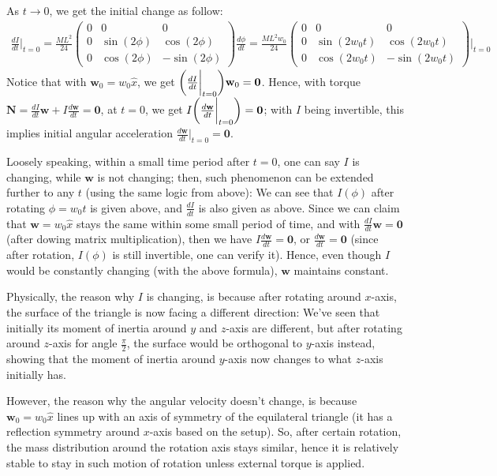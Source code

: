 \documentclass{article}
\DeclarePairedDelimiter{\paran}{(}{)}%
\newcommand{\bN}{\textbf{N}} %
\newcommand{\bw}{\textbf{w}} %
\newcommand{\bzero}{\textbf{0}}
\begin{document}
As $t\rightarrow 0$, we get the initial change as follow:
\begin{align}
    \frac{dI}{dt}\bigg|_{t=0} = \frac{ML^2}{24}\begin{pmatrix}
        0&0&0\\
        0&\sin(2\phi)&\cos(2\phi)\\
        0 & \cos(2\phi) & -\sin(2\phi)
    \end{pmatrix}\frac{d\phi}{dt} = \frac{ML^2w_0}{24}\begin{pmatrix}
        0&0&0\\
        0&\sin(2w_0t)&\cos(2w_0t)\\
        0 & \cos(2w_0t) & -\sin(2w_0t)
    \end{pmatrix}\bigg|_{t=0}
\end{align}
Notice that with $\bw_0 = w_0\hat{x}$, we get $\paran*{\frac{dI}{dt}\bigg|_{t=0}}\bw_0 = \bzero$. Hence, with torque $\bN = \frac{dI}{dt}\bw + I\frac{d\bw}{dt}=\bzero$, at $t=0$, we get $I\paran*{\frac{d\bw}{dt}\bigg|_{t=0}} = \bzero$; with $I$ being invertible, this implies initial angular acceleration $\frac{d\bw}{dt}\bigg|_{t=0}=\bzero$.

Loosely speaking, within a small time period after $t=0$, one can say $I$ is changing, while $\bw$ is not changing; then, such phenomenon can be extended further to any $t$ (using the same logic from above): We can see that $I(\phi)$ after rotating $\phi = w_0t$ is given above, and $\frac{dI}{dt}$ is also given as above. Since we can claim that $\bw=w_0\hat{x}$ stays the same within some small period of time, and with $\frac{dI}{dt}\bw = \bzero$ (after dowing matrix multiplication), then we have $I\frac{d\bw}{dt}=\bzero$, or $\frac{d\bw}{dt}=\bzero$ (since after rotation, $I(\phi)$ is still invertible, one can verify it). Hence, even though $I$ would be constantly changing (with the above formula), $\bw$ maintains constant.

Physically, the reason why $I$ is changing, is because after rotating around $x$-axis, the surface of the triangle is now facing a different direction: We've seen that initially its moment of inertia around $y$ and $z$-axis are different, but after rotating around $z$-axis for angle $\frac{\pi}{2}$, the surface would be orthogonal to $y$-axis instead, showing that the moment of inertia around $y$-axis now changes to what $z$-axis initially has.

However, the reason why the angular velocity doesn't change, is because $\bw_0 = w_0\hat{x}$ lines up with an axis of symmetry of the equilateral triangle (it has a reflection symmetry around $x$-axis based on the setup). So, after certain rotation, the mass distribution around the rotation axis stays similar, hence it is relatively stable to stay in such motion of rotation unless external torque is applied.
\end{document}
